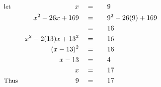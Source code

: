 \begin{alignat*}{5}
&\small\text{let}&x\quad&=\quad&&9\\
&\,&x^2-26x+169\quad&=&&9^2-26(9)+169\\
&\,&\,&=&&16\\
&\,&x^2-2(13)x+13^2\quad&=&&16\\
&\,&(x-13)^2\quad&=&&16\\
&\,&x-13\quad&=&&4\\
&\,&x\quad&=&&17\\
&\small\text{Thus}&9\quad&=&&17
\end{alignat*}
